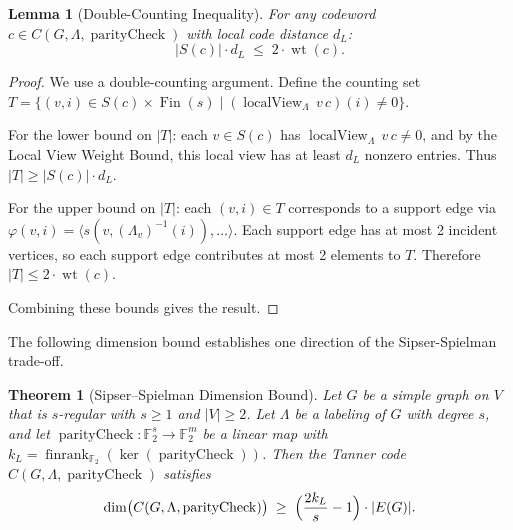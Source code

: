 \documentclass[11pt]{article}
\theoremstyle{plain}
\newtheorem*{theorem}{Theorem}
\newtheorem*{lemma}{Lemma}
\theoremstyle{definition}
\theoremstyle{remark}
\renewcommand{\ker}{\operatorname{ker}}
\begin{document}
\begin{lemma}[Double-Counting Inequality]
For any codeword $c \in C(G, \Lambda, \operatorname{parityCheck})$ with local code distance $d_L$:
\[
|S(c)| \cdot d_L \;\leq\; 2\cdot\operatorname{wt}(c).
\]
\end{lemma}

\begin{proof}
We use a double-counting argument. Define the counting set $T = \{(v, i) \in S(c) \times \operatorname{Fin}(s) \mid (\operatorname{localView}_\Lambda\,v\,c)(i) \neq 0\}$.

For the lower bound on $|T|$: each $v \in S(c)$ has $\operatorname{localView}_\Lambda\,v\,c \neq 0$, and by the Local View Weight Bound, this local view has at least $d_L$ nonzero entries. Thus $|T| \geq |S(c)| \cdot d_L$.

For the upper bound on $|T|$: each $(v,i) \in T$ corresponds to a support edge via $\varphi(v,i) = \langle s(v, (\Lambda_v)^{-1}(i)),\ldots\rangle$. Each support edge has at most 2 incident vertices, so each support edge contributes at most 2 elements to $T$. Therefore $|T| \leq 2 \cdot \operatorname{wt}(c)$.

Combining these bounds gives the result.
\end{proof}

The following dimension bound establishes one direction of the Sipser-Spielman trade-off.

\begin{theorem}[Sipser--Spielman Dimension Bound]
Let $G$ be a simple graph on $V$ that is $s$-regular with $s \geq 1$ and $|V| \geq 2$. Let $\Lambda$ be a labeling of $G$ with degree $s$, and let $\operatorname{parityCheck} : \mathbb{F}_2^s \to \mathbb{F}_2^m$ be a linear map with $k_L = \operatorname{finrank}_{\mathbb{F}_2}(\ker(\operatorname{parityCheck}))$. Then the Tanner code $C(G, \Lambda, \operatorname{parityCheck})$ satisfies
\[
\dim\bigl(C(G,\Lambda,\operatorname{parityCheck})\bigr) \;\geq\; \Bigl(\frac{2k_L}{s} - 1\Bigr)\cdot|E(G)|.
\]
\end{theorem}
\end{document}
